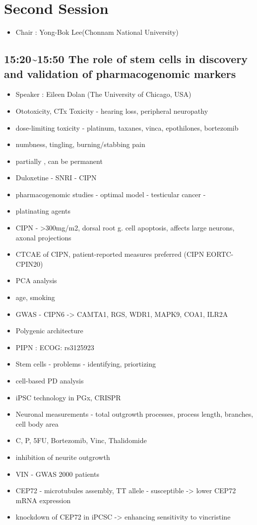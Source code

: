 \documentclass[]{book}
\providecommand{\tightlist}{%
  \setlength{\itemsep}{0pt}\setlength{\parskip}{0pt}}
\begin{document}
\section{Second Session}\label{second-session}

\begin{itemize}
\tightlist
\item
  Chair : Yong-Bok Lee(Chonnam National University)
\end{itemize}

\subsection{15:20\textasciitilde{}15:50 The role of stem cells in
discovery and validation of pharmacogenomic
markers}\label{the-role-of-stem-cells-in-discovery-and-validation-of-pharmacogenomic-markers}

\begin{itemize}
\tightlist
\item
  Speaker : Eileen Dolan (The University of Chicago, USA)
\item
  Ototoxicity, CTx Toxicity - hearing loss, peripheral neuropathy
\item
  dose-limiting toxicity - platinum, taxanes, vinca, epothilones,
  bortezomib
\item
  numbness, tingling, burning/stabbing pain
\item
  partially , can be permanent
\item
  Duloxetine - SNRI - CIPN
\item
  pharmacogenomic studies - optimal model - testicular cancer -
\item
  platinating agents
\item
  CIPN - \textgreater{}300mg/m2, dorsal root g. cell apoptosis, affects
  large neurons, axonal projections
\item
  CTCAE of CIPN, patient-reported measures preferred (CIPN EORTC-CPIN20)
\item
  PCA analysis
\item
  age, smoking
\item
  GWAS - CIPN6 -\textgreater{} CAMTA1, RGS, WDR1, MAPK9, COA1, ILR2A
\item
  Polygenic architecture
\item
  PIPN : ECOG: rs3125923
\item
  Stem cells - problems - identifying, priortizing
\item
  cell-based PD analysis
\item
  iPSC technology in PGx, CRISPR
\item
  Neuronal measurements - total outgrowth processes, process length,
  branches, cell body area
\item
  C, P, 5FU, Bortezomib, Vinc, Thalidomide
\item
  inhibition of neurite outgrowth
\item
  VIN - GWAS 2000 patients
\item
  CEP72 - microtubules assembly, TT allele - susceptible -\textgreater{}
  lower CEP72 mRNA expression
\item
  knockdown of CEP72 in iPCSC -\textgreater{} enhancing sensitivity to
  vincristine
\end{itemize}
\end{document}

